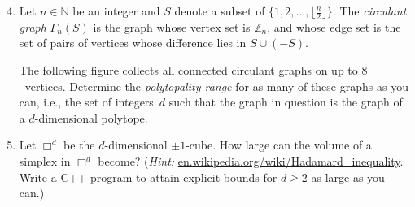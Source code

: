 \documentclass[11pt]{amsart}
\newcommand{\N}{\mathbb{N}}
\newcommand{\Z}{\mathbb{Z}}
\theoremstyle{definition}
\begin{document}
\begin{enumerate}
\setcounter{enumi}{3}
\item Let $n\in\N$ be an integer and $S$ denote a subset of
  $\{1,2,\dots,\lfloor\frac{n}{2}\rfloor\}$.  
  The \emph{circulant graph} $\Gamma_n(S)$ is the graph whose vertex set is $\Z_n$, and whose edge set is the set of pairs of vertices whose difference lies in $S\cup (-S)$. 

The following figure collects all connected circulant graphs on up to $8$~vertices. Determine the \emph{polytopality range} for as many of these graphs as you can, i.e., the set of integers~$d$ such that the graph in question is the graph of a $d$-dimensional polytope.


\item Let $\Box^d$ be the $d$-dimensional $\pm1$-cube. How large can the volume of a simplex in $\Box^d$ become? (\emph{Hint:} \url{en.wikipedia.org/wiki/Hadamard_inequality}. Write a  C++ program to attain explicit bounds for $d\ge2$ as large as you can.)
\end{enumerate}
\end{document}
